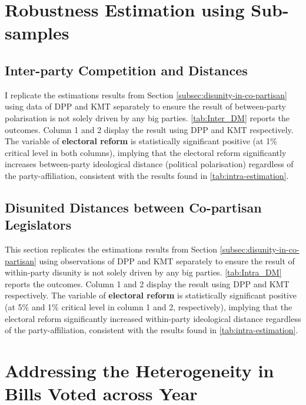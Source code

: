 \clearpage

\section{\centering Robustness Estimation using Sub-samples\label{sec:robustness-check}}
\subsection{Inter-party Competition and Distances\label{subsec:robustness-inter-party}}

I replicate the estimations results from Section \ref{subsec:disunity-in-co-partisan} using data of DPP and KMT separately to ensure the result of between-party polarisation is not solely driven by any big parties. \autoref{tab:Inter_DM} reports the outcomes. Column 1 and 2 display the result using DPP and KMT respectively. The variable of \textbf{electoral reform } is statistically significant positive (at 1\% critical level in both columns), implying that the electoral reform significantly increases between-party ideological distance (political polarisation) regardless of the party-affiliation, consistent with the results found in \autoref{tab:intra-estimation}.



\subsection{Disunited Distances between Co-partisan Legislators \label{subsec:disunity-robust}}

This section replicates the estimations results from Section \autoref{subsec:disunity-in-co-partisan} using observations of DPP and KMT separately to ensure the result of within-party disunity is not solely driven by any big parties. \autoref{tab:Intra_DM} reports the outcomes. Column 1 and 2 display the result using DPP and KMT respectively. The variable of \textbf{electoral reform} is statistically significant positive (at 5\% and 1\% critical level in column 1 and 2, respectively), implying that the electoral reform significantly increased within-party ideological distance regardless of the party-affiliation, consistent with the results found in  \ref{tab:intra-estimation}.



\clearpage

\section{Addressing the Heterogeneity in Bills Voted across Year\label{sec:Addressing-the-heterogeneity}} 

